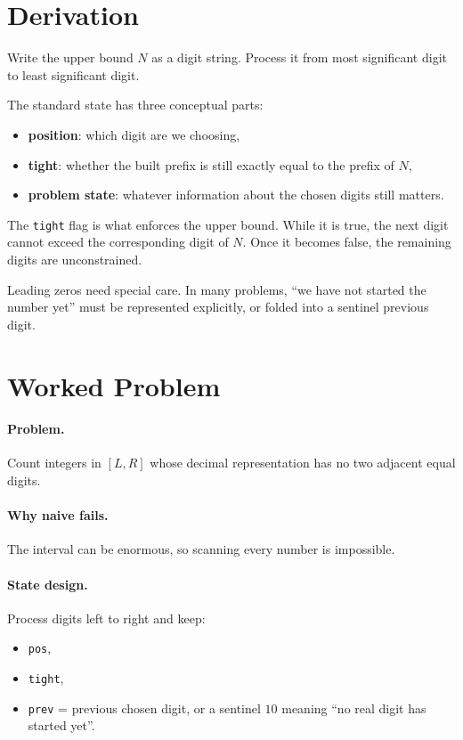 \section*{Derivation}

Write the upper bound \(N\) as a digit string. Process it from most significant digit to least significant digit.

The standard state has three conceptual parts:

\begin{itemize}
  \item \textbf{position}: which digit are we choosing,
  \item \textbf{tight}: whether the built prefix is still exactly equal to the prefix of \(N\),
  \item \textbf{problem state}: whatever information about the chosen digits still matters.
\end{itemize}

The \texttt{tight} flag is what enforces the upper bound. While it is true, the next digit cannot exceed the
corresponding digit of \(N\). Once it becomes false, the remaining digits are unconstrained.

Leading zeros need special care. In many problems, ``we have not started the number yet'' must be represented
explicitly, or folded into a sentinel previous digit.

\section*{Worked Problem}

\paragraph{Problem.}
Count integers in \([L,R]\) whose decimal representation has no two adjacent equal digits.

\paragraph{Why naive fails.}
The interval can be enormous, so scanning every number is impossible.

\paragraph{State design.}
Process digits left to right and keep:

\begin{itemize}
  \item \texttt{pos},
  \item \texttt{tight},
  \item \texttt{prev} = previous chosen digit, or a sentinel \(10\) meaning ``no real digit has started yet''.
\end{itemize}

